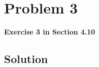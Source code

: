 
\begingroup
\allowdisplaybreaks

\newpage
\section{Problem 3}

\textbf{Exercise 3 in Section 4.10}

\subsection{Solution}